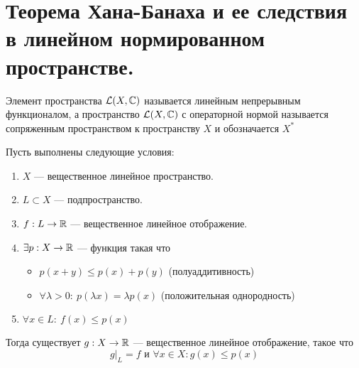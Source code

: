 \newpage
\section{Теорема Хана-Банаха и ее следствия в линейном нормированном пространстве.}

\begin{definition}
	Элемент пространства $\mathcal{L}(X, \mathbb{C})$ называется линейным непрерывным функционалом, а пространство $\mathcal{L}(X, \mathbb{C})$ с операторной нормой называется сопряженным пространством к пространству $X$ и обозначается $X^*$
\end{definition}

\begin{theorem}\label{th:h-b}
	Пусть выполнены следующие условия:
	\begin{enumerate}
		\item $X$ --- вещественное линейное пространство.
		\item $L \subset X$ --- подпространство.
		\item $f: L \to \mathbb{R}$ --- вещественное линейное отображение.
		\item $\exists p: X \to \mathbb{R}$ --- функция такая что
		\begin{itemize}
			\item $p(x + y) \leq p(x) + p(y)$ (полуаддитивность)
			\item $\forall \lambda > 0: \ p(\lambda x ) = \lambda p(x)$ (положительная однородность)
		\end{itemize}
		\item $\forall x \in L: \ f(x) \leq p(x)$
	\end{enumerate}
	Тогда существует $g: X \to \mathbb{R}$ --- вещественное линейное отображение, такое что 
	$$
	g\big\vert_{L} = f \text{ и }  \forall x \in X: g(x) \leq p(x)
	$$
\end{theorem}
